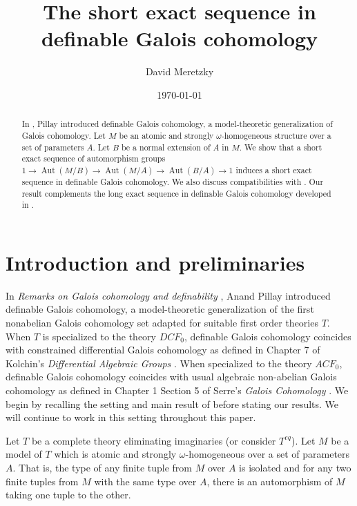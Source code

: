 \documentclass{article}
\title{The short exact sequence in definable Galois cohomology}
\author{David Meretzky}
\date{\today}
\theoremstyle{problemstyle}
\DeclareMathOperator{\aut}{Aut} %
\begin{document}
\maketitle

\begin{abstract}
    \noindent In \cite{pillay_1997}, Pillay introduced definable Galois cohomology, a model-theoretic generalization of Galois cohomology. Let $M$ be an atomic and strongly $\omega$-homogeneous structure over a set of parameters $A$. Let $B$ be a normal extension of $A$ in $M$. We show that a short exact sequence of automorphism groups $1 \to \aut(M/B) \to \aut(M/A) \to \aut(B/A) \to 1$  induces a short exact sequence in definable Galois cohomology. We also discuss compatibilities with \cite{pillay2024automorphism}. Our result complements the long exact sequence in definable Galois cohomology developed in \cite{OmarAnandDavid}.
\end{abstract}


\section{Introduction and preliminaries}

In \textit{Remarks on Galois cohomology and definability} \cite{pillay_1997}, Anand Pillay introduced definable Galois cohomology, a model-theoretic generalization of the first nonabelian Galois cohomology set adapted for suitable first order theories $T$. When $T$ is specialized to the theory $DCF_0$, definable Galois cohomology coincides with constrained differential Galois cohomology as defined in Chapter 7 of Kolchin's \textit{Differential Algebraic Groups} \cite{kolchin1985differential}. When specialized to the theory $ACF_0$, definable Galois cohomology coincides with usual algebraic non-abelian Galois cohomology as defined in Chapter 1 Section 5 of Serre's \textit{Galois Cohomology} \cite{serre1979galois}. We begin by recalling the setting and main result of \cite{pillay_1997} before stating our results. We will continue to work in this setting throughout this paper.

Let $T$ be a complete theory eliminating imaginaries (or consider $T^{eq}$). Let $M$ be a model of $T$ which is atomic and strongly $\omega$-homogeneous over a set of parameters $A$. That is, the type of any finite tuple from $M$ over $A$ is isolated and for any two finite tuples from $M$ with the same type over $A$, there is an automorphism of $M$ taking one tuple to the other. 
\end{document}
